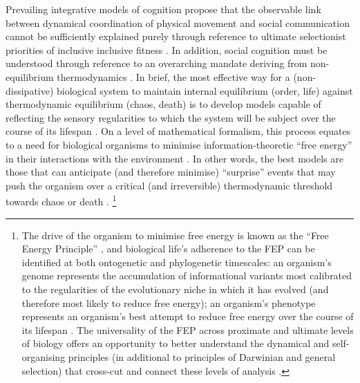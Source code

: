 \begin{CJK}{UTF8}{gbsn}
Prevailing integrative models of cognition propose that the observable link between dynamical coordination of physical movement and social communication cannot be sufficiently explained purely through reference to ultimate selectionist priorities of inclusive inclusive fitness \cite{Badcock2012}.  In addition, social cognition must be understood through reference to an overarching mandate deriving from non-equilibrium thermodynamics \citep{Schrodinger1944}.  In brief, the most effective way for a (non-dissipative) biological system to maintain internal equilibrium (order, life) against thermodynamic equilibrium (chaos, death) is to develop models capable of reflecting the sensory regularities to which the system will be subject over the course of its lifespan \citep{Conant1970,Yufik2016}. On a level of mathematical formalism, this process equates to a need for biological organisms to minimise information-theoretic ``free energy'' in their interactions with the environment \citep{Friston2006,Ramstead2017,Yufik2017}.  In other words, the best models are those that can anticipate (and therefore minimise) ``surprise'' events that may push the organism over a critical (and irreversible) thermodynamic threshold towards chaos or death \citep[here surprise can be understood as a rough equivalent of free energy, see][]{Friston2013}.
  \footnote{The drive of the organism to minimise free energy is known as the ``Free Energy Principle'' \citep[hereafter FEP; see][]{Friston2010}, and biological life's adherence to the FEP can be identified at both ontogenetic and phylogenetic timescales: an organism's genome represents the accumulation of informational variants most calibrated to the regularities of the evolutionary niche in which it has evolved (and therefore most likely to reduce free energy); an organism's phenotype represents an organism's best attempt to reduce free energy over the course of its lifespan \citep{Ramstead2017}.  The universality of the FEP across proximate and ultimate levels of biology offers an opportunity to better understand the dynamical and self-organising principles (in additional to principles of Darwinian and general selection) that cross-cut and connect these levels of analysis \citep{Caporael2001,Badcock2012,Laland2015,Ramstead2017}.}


\end{CJK}
